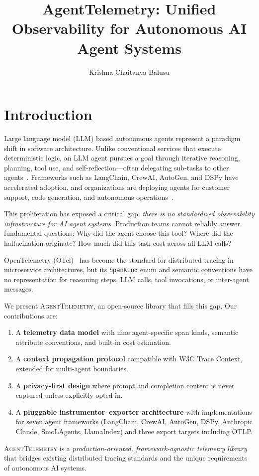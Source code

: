 \documentclass[sigplan,10pt,screen]{acmart}
\title{AgentTelemetry: Unified Observability for Autonomous AI Agent Systems}
\author{Krishna Chaitanya Balusu}
\affiliation{%
  \institution{Independent Researcher}
  \country{United States}
}
\begin{document}
\maketitle

\section{Introduction}
\label{sec:introduction}

Large language model (LLM) based autonomous agents represent a paradigm shift
in software architecture.  Unlike conventional services that execute
deterministic logic, an LLM agent pursues a goal through iterative reasoning,
planning, tool use, and self-reflection---often delegating sub-tasks to other
agents~\cite{agentbench,agentboard}.  Frameworks such as LangChain, CrewAI,
AutoGen, and DSPy have accelerated adoption, and organizations are deploying
agents for customer support, code generation, and autonomous
operations~\cite{aiops_survey}.

This proliferation has exposed a critical gap: \emph{there is no
standardized observability infrastructure for AI agent systems}.
Production teams cannot reliably answer fundamental questions: Why did
the agent choose this tool?  Where did the hallucination originate?
How much did this task cost across all LLM calls?

OpenTelemetry (OTel)~\cite{otel} has become the standard for
distributed tracing in microservice architectures, but its
\texttt{Span\-Kind} enum and semantic conventions have no
representation for reasoning steps, LLM calls, tool invocations,
or inter-agent messages.

We present \textsc{AgentTelemetry}, an open-source library that fills
this gap.  Our contributions are:
\begin{enumerate}[leftmargin=*,nosep]
    \item A \textbf{telemetry data model} with nine agent-specific span
        kinds, semantic attribute conventions, and built-in cost estimation.
    \item A \textbf{context propagation protocol} compatible with W3C
        Trace Context, extended for multi-agent boundaries.
    \item A \textbf{privacy-first design} where prompt and completion
        content is never captured unless explicitly opted in.
    \item A \textbf{pluggable instrumentor--exporter architecture}
        with implementations for seven agent frameworks (LangChain,
        CrewAI, AutoGen, DSPy, Anthropic Claude, SmoLAgents,
        LlamaIndex) and three export targets including OTLP.
\end{enumerate}
\textsc{AgentTelemetry} is a \emph{production-oriented,
framework-agnostic telemetry library} that bridges existing distributed
tracing standards and the unique requirements of autonomous AI systems.
\end{document}
